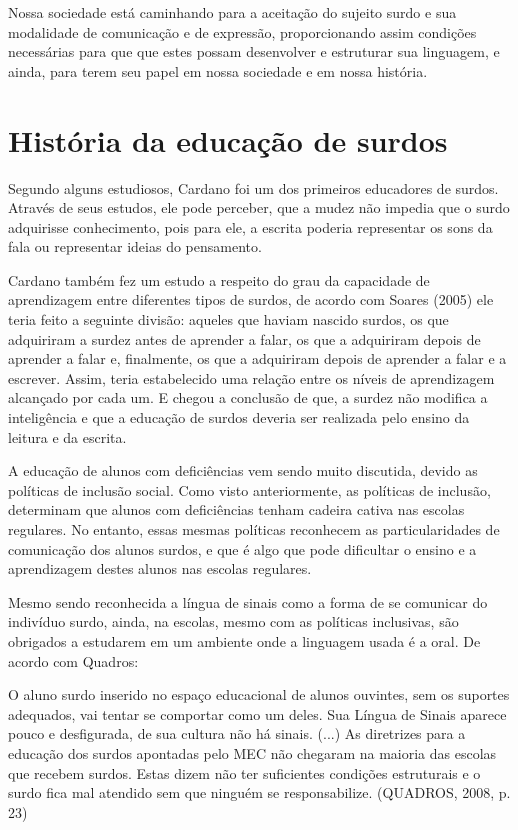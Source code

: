 \documentclass[brasil]{abnt}
\begin{document}
		Nossa sociedade está caminhando para a aceitação do sujeito surdo e sua modalidade de comunicação e de expressão, proporcionando assim condições necessárias para que que estes possam desenvolver 
		e estruturar sua linguagem, e ainda, para terem seu papel em nossa sociedade e em nossa história. 
			
\chapter{História da educação de surdos}
		
	Segundo alguns estudiosos, Cardano foi um dos primeiros educadores de surdos. Através de seus estudos, ele pode perceber, que a mudez não impedia que o surdo adquirisse conhecimento, pois para ele, a 
	escrita poderia representar os sons da fala ou representar ideias do pensamento. 
	
	Cardano também fez um estudo a respeito do grau da capacidade de aprendizagem entre diferentes tipos de surdos, de acordo com Soares (2005) ele teria feito a seguinte divisão: aqueles que haviam 
	nascido surdos, os que adquiriram a surdez antes de aprender a falar, os que a adquiriram depois de aprender a falar e, finalmente, os que a adquiriram depois de aprender a falar e a escrever. 
	Assim, teria estabelecido uma relação entre os níveis de aprendizagem alcançado por cada um. E chegou a conclusão de que, a surdez não modifica a inteligência e que a educação de surdos deveria ser 
	realizada pelo ensino da leitura e da escrita.
	
	A educação de alunos com deficiências vem sendo muito discutida, devido as políticas de inclusão social. Como visto anteriormente, as políticas de inclusão, 
	determinam que alunos com deficiências tenham cadeira cativa nas escolas regulares. No entanto, essas mesmas políticas reconhecem as particularidades de comunicação dos alunos surdos, e que é algo 
	que pode dificultar o ensino e a aprendizagem destes alunos nas escolas regulares.
	
	Mesmo sendo reconhecida a língua de sinais como a forma de se comunicar do indivíduo surdo, ainda, na escolas, mesmo com as políticas inclusivas, são obrigados a estudarem em um ambiente onde
	a linguagem usada é a oral. De acordo com Quadros:
					
		\begin{citacao}O aluno surdo inserido no espaço educacional de alunos ouvintes, sem os suportes adequados, vai tentar se comportar como um deles. Sua Língua de Sinais aparece pouco e desfigurada, 
						de sua cultura não há sinais. (...) As diretrizes para a educação dos surdos apontadas pelo MEC não chegaram na maioria das escolas que recebem surdos. Estas dizem não ter suficientes 
						condições estruturais e o surdo fica mal atendido sem que ninguém se responsabilize. (QUADROS, 2008, p. 23)
		\end{citacao}
		
\end{document}
